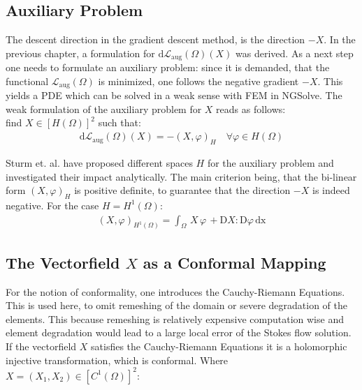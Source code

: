 \subsection{Auxiliary Problem}
The descent direction in the gradient descent method, is the direction $-X$.
In the previous chapter, a formulation for $\mathrm{d}\mathcal{L}_{\mathrm{aug}}(\Omega)(X)$
was derived. As a next step one needs to formulate an auxiliary problem: since it is demanded,
that the functional $\mathcal{L}_{\mathrm{aug}}(\Omega)$ is minimized, one follows the 
negative gradient $-X$. This yields a PDE which can be solved in a weak sense with FEM in NGSolve.
The weak formulation of the auxiliary problem for $X$ reads as follows:\\

find $X \in [H(\Omega)]^2$ such that:
\begin{align}
	\mathrm{d}\mathcal{L}_{\mathrm{aug}}(\Omega)(X) = -(X,\varphi)_H \quad \forall \varphi \in H(\Omega)
\end{align}

Sturm et. al. \cite{nearly_conformal_paper} have proposed different spaces $H$ for the auxiliary problem
and investigated their impact analytically. The main criterion being, that the bi-linear 
form $(X,\varphi)_H$ is positive definite,
to guarantee that the direction $-X$ is indeed negative. For the case $H=H^1(\Omega)$:
\begin{align}
	(X,\varphi)_{H^1(\Omega)} = \int_{\Omega} \, X \, \varphi \, + \mathrm{D}X:\mathrm{D}\varphi \, \mathrm{dx}
\end{align}

\subsection{The Vectorfield $X$ as a Conformal Mapping}
For the notion of conformality, one introduces the Cauchy-Riemann Equations. This is used here,
to omit remeshing of the domain or severe degradation of the elements.
This because remeshing is relatively expensive computation wise and element degradation
would lead to a large local error of the Stokes flow solution.
If the vectorfield $X$ satisfies the Cauchy-Riemann Equations it is a holomorphic injective 
transformation, which is conformal. Where $X = (X_1, X_2) \in [C^1(\Omega)]^2$:

